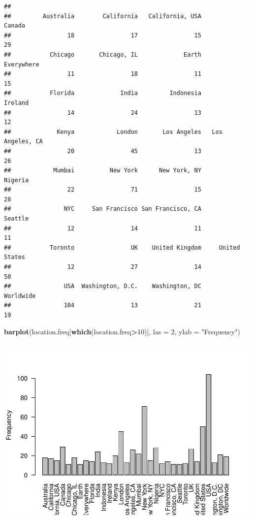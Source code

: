 \documentclass[
]{article}
\newenvironment{Shaded}{\begin{snugshade}}{\end{snugshade}}
\newcommand{\DataTypeTok}[1]{\textcolor[rgb]{0.13,0.29,0.53}{#1}}
\newcommand{\DecValTok}[1]{\textcolor[rgb]{0.00,0.00,0.81}{#1}}
\newcommand{\KeywordTok}[1]{\textcolor[rgb]{0.13,0.29,0.53}{\textbf{#1}}}
\newcommand{\NormalTok}[1]{#1}
\newcommand{\OperatorTok}[1]{\textcolor[rgb]{0.81,0.36,0.00}{\textbf{#1}}}
\newcommand{\StringTok}[1]{\textcolor[rgb]{0.31,0.60,0.02}{#1}}
\begin{document}
\begin{verbatim}
## 
##         Australia        California   California, USA            Canada 
##                18                17                15                29 
##           Chicago       Chicago, IL             Earth        Everywhere 
##                11                18                11                15 
##           Florida             India         Indonesia           Ireland 
##                14                24                13                12 
##             Kenya            London       Los Angeles   Los Angeles, CA 
##                20                45                13                26 
##            Mumbai          New York      New York, NY           Nigeria 
##                22                71                15                28 
##               NYC     San Francisco San Francisco, CA           Seattle 
##                12                14                11                11 
##           Toronto                UK    United Kingdom     United States 
##                12                27                14                50 
##               USA  Washington, D.C.    Washington, DC         Worldwide 
##               104                13                21                19
\end{verbatim}

\begin{Shaded}
\begin{Highlighting}[]
\KeywordTok{barplot}\NormalTok{(location.freq[}\KeywordTok{which}\NormalTok{(location.freq}\OperatorTok{>}\DecValTok{10}\NormalTok{)], }\DataTypeTok{las =} \DecValTok{2}\NormalTok{,  }
        \DataTypeTok{ylab =} \StringTok{"Frequency"}\NormalTok{)}
\end{Highlighting}
\end{Shaded}

\begin{center}\includegraphics[width=0.7\linewidth]{document_files/figure-latex/unnamed-chunk-11-1} \end{center}
\end{document}
